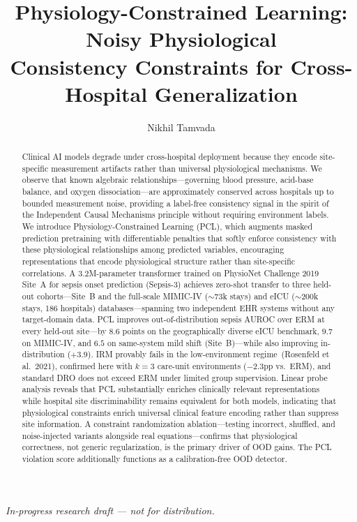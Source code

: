\documentclass{article}
\title{Physiology-Constrained Learning: Noisy Physiological\\Consistency Constraints for Cross-Hospital Generalization}
\author{%
  Nikhil Tamvada
}
\begin{document}
\raggedbottom

\maketitle

\begin{center}
\emph{In-progress research draft --- not for distribution.}
\end{center}

\begin{abstract}
Clinical AI models degrade under cross-hospital deployment because they encode
site-specific measurement artifacts rather than universal physiological mechanisms.
We observe that known algebraic relationships---governing blood pressure, acid-base
balance, and oxygen dissociation---are approximately conserved across hospitals up to
bounded measurement noise, providing a label-free consistency signal in the spirit of
the Independent Causal Mechanisms principle without requiring environment labels.
We introduce Physiology-Constrained Learning (PCL), which augments masked
prediction pretraining with differentiable penalties that softly enforce consistency
with these physiological relationships among predicted variables, encouraging
representations that encode physiological structure rather than site-specific
correlations.
A 3.2M-parameter transformer trained on PhysioNet Challenge 2019 Site~A for
sepsis onset prediction (Sepsis-3) achieves zero-shot transfer to three held-out
cohorts---Site~B and the full-scale MIMIC-IV ($\sim$73k stays) and eICU
($\sim$200k stays, 186 hospitals) databases---spanning two independent EHR systems
without any target-domain data.
PCL improves out-of-distribution sepsis AUROC over ERM at every held-out site---by
$8.6$ points on the geographically diverse eICU benchmark, $9.7$ on MIMIC-IV, and
$6.5$ on same-system mild shift (Site~B)---while also improving in-distribution
($+3.9$). IRM provably fails in the low-environment regime~(Rosenfeld et al.\ 2021),
confirmed here with $k{=}3$ care-unit environments ($-2.3$pp vs.\ ERM), and standard
DRO does not exceed ERM under limited group supervision.
Linear probe analysis reveals that PCL substantially enriches clinically relevant
representations while hospital site discriminability remains
equivalent for both models, indicating that physiological
constraints enrich universal clinical feature encoding rather than suppress site
information.
A constraint randomization ablation---testing incorrect, shuffled, and noise-injected
variants alongside real equations---confirms that physiological correctness, not
generic regularization, is the primary driver of OOD gains.
The PCL violation score additionally functions as a calibration-free OOD detector.
\end{abstract}
\end{document}

